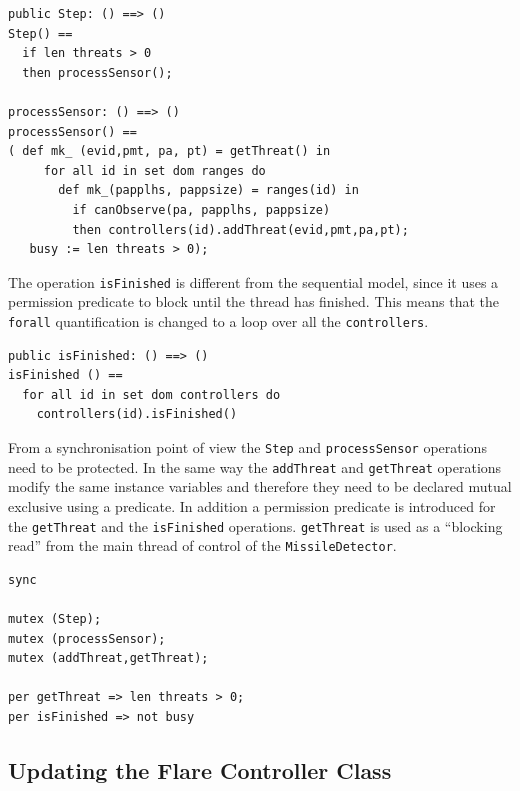 \documentclass{overturerepchap}
\begin{document}
\begin{lstlisting} 
public Step: () ==> ()
Step() ==
  if len threats > 0
  then processSensor();

processSensor: () ==> ()
processSensor() ==
( def mk_ (evid,pmt, pa, pt) = getThreat() in
     for all id in set dom ranges do
       def mk_(papplhs, pappsize) = ranges(id) in
         if canObserve(pa, papplhs, pappsize)
         then controllers(id).addThreat(evid,pmt,pa,pt);
   busy := len threats > 0);
\end{lstlisting}

The operation \texttt{isFinished} is different from the sequential
model, since it uses a permission predicate to block until the thread
has finished. This means that the \texttt{forall} quantification is
changed to a loop over all the \texttt{controllers}.

\begin{lstlisting}
public isFinished: () ==> ()
isFinished () ==
  for all id in set dom controllers do
    controllers(id).isFinished()
\end{lstlisting}

From a synchronisation point of view the \texttt{Step} and \texttt{processSensor} operations need to be protected. In the same way the \texttt{addThreat} and 
\texttt{getThreat} operations modify the same instance variables and
therefore they need to be declared mutual exclusive using a
{\bf{}} 
predicate. In addition a permission predicate is introduced for the
\texttt{getThreat} and the \texttt{isFinished} operations. 
\texttt{getThreat} is used as a ``blocking read'' from the main
thread of control of the \texttt{MissileDetector}.

\begin{lstlisting}
sync

mutex (Step);
mutex (processSensor);
mutex (addThreat,getThreat);

per getThreat => len threats > 0;
per isFinished => not busy
\end{lstlisting}

\subsection{Updating the Flare Controller Class}

%
\end{document}
